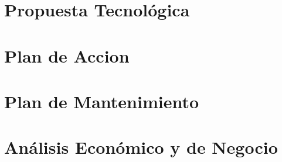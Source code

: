 \documentclass[12pt,letterpaper]{article}
\begin{document}
	
	
	
	

	
	




\part{Propuesta Tecnológica}\label{propuesta-tecno}
	


\part{Plan de Accion}\label{plan-accion}
	


\part{Plan de Mantenimiento}\label{plan-mantenimiento}
	


\part{Análisis Económico y de Negocio}\label{analisis-economico}
	
	
	
	


%	

 
\end{document}
